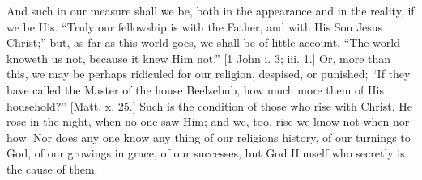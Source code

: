 And such in our measure shall we be, both in the appearance and in
the reality, if we be His. ``Truly our fellowship is with the
Father, and with His Son Jesus Christ;'' but, as far as this world
goes, we shall be of little account. ``The world knoweth us not,
because it knew Him not.'' [1 John i. 3; iii. 1.] Or, more than
this, we may be perhaps ridiculed for our religion, despised, or
punished; ``If they have called the Master of the house Beelzebub,
how much more them of His household?'' [Matt. x. 25.] Such is the
condition of those who rise with Christ. He rose in the night, when no
one saw Him; and we, too, rise we know not when nor how. Nor does any
one know any thing of our religions history, of our turnings to God,
of our growings in grace, of our successes, but God Himself who
secretly is the cause of them.

